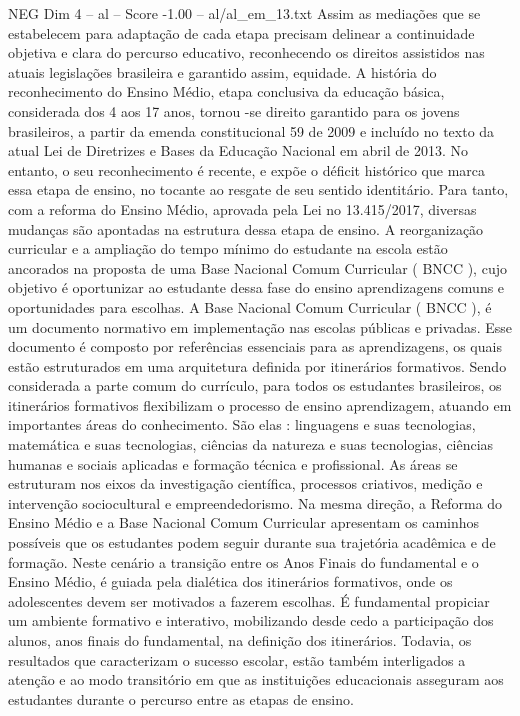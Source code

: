 \begin{textsample}{NEG Dim 4 – al – Score -1.00 – al/al\_em\_13.txt}
Assim as mediações que se estabelecem para adaptação de cada etapa precisam delinear a continuidade objetiva e clara do percurso educativo, reconhecendo os direitos assistidos nas atuais legislações brasileira e garantido assim, equidade.
A história do reconhecimento do Ensino Médio, etapa conclusiva da educação básica, considerada dos 4 aos 17 anos, tornou -se direito garantido para os jovens brasileiros, a partir da emenda constitucional 59 de 2009 e incluído no texto da atual Lei de Diretrizes e Bases da Educação Nacional em abril de 2013.
No entanto, o seu reconhecimento é recente, e expõe o déficit histórico que marca essa etapa de ensino, no tocante ao resgate de seu sentido identitário.
Para tanto, com a reforma do Ensino Médio, aprovada pela Lei no 13.415/2017, diversas mudanças são apontadas na estrutura dessa etapa de ensino.
A reorganização curricular e a ampliação do tempo mínimo do estudante na escola estão ancorados na proposta de uma Base Nacional Comum Curricular ( BNCC ), cujo objetivo é oportunizar ao estudante dessa fase do ensino aprendizagens comuns e oportunidades para escolhas.
A Base Nacional Comum Curricular ( BNCC ), é um documento normativo em implementação nas escolas públicas e privadas.
Esse documento é composto por referências essenciais para as aprendizagens, os quais estão estruturados em uma arquitetura definida por itinerários formativos.
Sendo considerada a parte comum do currículo, para todos os estudantes brasileiros, os itinerários formativos flexibilizam o processo de ensino aprendizagem, atuando em importantes áreas do conhecimento.
São elas : linguagens e suas tecnologias, matemática e suas tecnologias, ciências da natureza e suas tecnologias, ciências humanas e sociais aplicadas e formação técnica e profissional.
As áreas se estruturam nos eixos da investigação científica, processos criativos, medição e intervenção sociocultural e empreendedorismo.
Na mesma direção, a Reforma do Ensino Médio e a Base Nacional Comum Curricular apresentam os caminhos possíveis que os estudantes podem seguir durante sua trajetória acadêmica e de formação.
Neste cenário a transição entre os Anos Finais do fundamental e o Ensino Médio, é guiada pela dialética dos itinerários formativos, onde os adolescentes devem ser motivados a fazerem escolhas.
É fundamental propiciar um ambiente formativo e interativo, mobilizando desde cedo a participação dos alunos, anos finais do fundamental, na definição dos itinerários.
Todavia, os resultados que caracterizam o sucesso escolar, estão também interligados a atenção e ao modo transitório em que as instituições educacionais asseguram aos estudantes durante o percurso entre as etapas de ensino.

\end{textsample}
